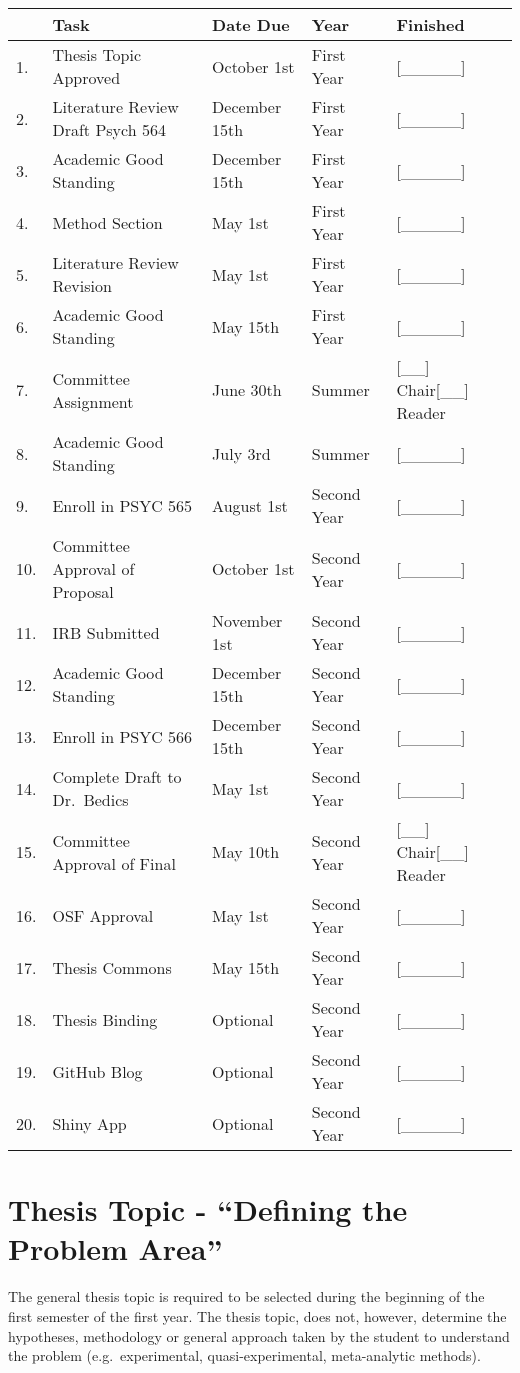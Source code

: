\documentclass[]{book}
\begin{document}
\begin{longtable}[]{@{}lllll@{}}
\toprule
& Task & Date Due & Year & Finished\tabularnewline
\midrule
\endhead
1. & Thesis Topic Approved & October 1st & First Year & {[}\_\_\_\_\_{]}\tabularnewline
2. & Literature Review Draft Psych 564 & December 15th & First Year & {[}\_\_\_\_\_{]}\tabularnewline
3. & Academic Good Standing & December 15th & First Year & {[}\_\_\_\_\_{]}\tabularnewline
4. & Method Section & May 1st & First Year & {[}\_\_\_\_\_{]}\tabularnewline
5. & Literature Review Revision & May 1st & First Year & {[}\_\_\_\_\_{]}\tabularnewline
6. & Academic Good Standing & May 15th & First Year & {[}\_\_\_\_\_{]}\tabularnewline
7. & Committee Assignment & June 30th & Summer & {[}\_\_{]} Chair{[}\_\_{]} Reader\tabularnewline
8. & Academic Good Standing & July 3rd & Summer & {[}\_\_\_\_\_{]}\tabularnewline
9. & Enroll in PSYC 565 & August 1st & Second Year & {[}\_\_\_\_\_{]}\tabularnewline
10. & Committee Approval of Proposal & October 1st & Second Year & {[}\_\_\_\_\_{]}\tabularnewline
11. & IRB Submitted & November 1st & Second Year & {[}\_\_\_\_\_{]}\tabularnewline
12. & Academic Good Standing & December 15th & Second Year & {[}\_\_\_\_\_{]}\tabularnewline
13. & Enroll in PSYC 566 & December 15th & Second Year & {[}\_\_\_\_\_{]}\tabularnewline
14. & Complete Draft to Dr.~Bedics & May 1st & Second Year & {[}\_\_\_\_\_{]}\tabularnewline
15. & Committee Approval of Final & May 10th & Second Year & {[}\_\_{]} Chair{[}\_\_{]} Reader\tabularnewline
16. & OSF Approval & May 1st & Second Year & {[}\_\_\_\_\_{]}\tabularnewline
17. & Thesis Commons & May 15th & Second Year & {[}\_\_\_\_\_{]}\tabularnewline
18. & Thesis Binding & Optional & Second Year & {[}\_\_\_\_\_{]}\tabularnewline
19. & GitHub Blog & Optional & Second Year & {[}\_\_\_\_\_{]}\tabularnewline
20. & Shiny App & Optional & Second Year & {[}\_\_\_\_\_{]}\tabularnewline
\bottomrule
\end{longtable}

\hypertarget{thesis-topic---defining-the-problem-area}{%
\section{Thesis Topic - ``Defining the Problem Area''}\label{thesis-topic---defining-the-problem-area}}

The general thesis topic is required to be selected during the beginning of the first semester of the first year. The thesis topic, does not, however, determine the hypotheses, methodology or general approach taken by the student to understand the problem (e.g.~experimental, quasi-experimental, meta-analytic methods).
\end{document}
